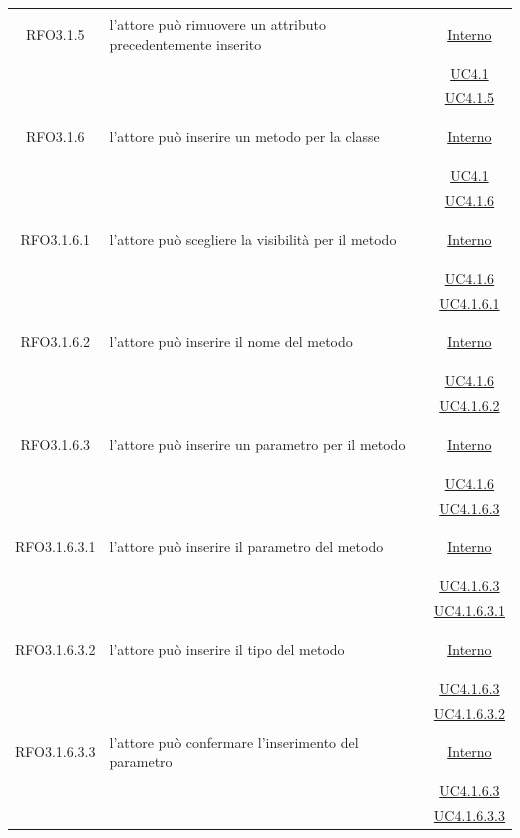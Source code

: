 \begin{itemize}
\begin{itemize}
\begin{itemize}
\begin{itemize}
\begin{longtable}{|c|>{\centering}m{7cm}|c|}
\hypertarget{RFO3.1.5}{RFO3.1.5} & l'attore può rimuovere un attributo precedentemente inserito & \hyperlink{Interno}{Interno}\\
& &\hyperref[UC4.1]{UC4.1}\\
& &\hyperref[UC4.1.5]{UC4.1.5}\\ \hline

\hypertarget{RFO3.1.6}{RFO3.1.6} & l'attore può inserire un metodo per la classe &\hyperlink{Interno}{Interno}\\
& &\hyperref[UC4.1]{UC4.1}\\
& &\hyperref[UC4.1.6]{UC4.1.6}\\ \hline

\hypertarget{RFO3.1.6.1}{RFO3.1.6.1} & l'attore può scegliere la visibilità per il metodo &\hyperlink{Interno}{Interno}\\
& &\hyperref[UC4.1.6]{UC4.1.6}\\
& &\hyperref[UC4.1.6.1]{UC4.1.6.1}\\ \hline

\hypertarget{RFO3.1.6.2}{RFO3.1.6.2} & l'attore può inserire il nome del metodo & \hyperlink{Interno}{Interno}\\
& &\hyperref[UC4.1.6]{UC4.1.6}\\
& &\hyperref[UC4.1.6.2]{UC4.1.6.2}\\ \hline

\hypertarget{RFO3.1.6.3}{RFO3.1.6.3} & l'attore può inserire un parametro per il metodo & \hyperlink{Interno}{Interno}\\
& &\hyperref[UC4.1.6]{UC4.1.6}\\
& &\hyperref[UC4.1.6.3]{UC4.1.6.3}\\ \hline

\hypertarget{RFO3.1.6.3.1}{RFO3.1.6.3.1} & l'attore può inserire il parametro del metodo &\hyperlink{Interno}{Interno}\\
& & \hyperref[UC4.1.6.3]{UC4.1.6.3}\\
& & \hyperref[UC4.1.6.3.1]{UC4.1.6.3.1}\\ \hline

\hypertarget{RFO3.1.6.3.2}{RFO3.1.6.3.2} & l'attore può inserire il tipo del metodo &\hyperlink{Interno}{Interno}\\
& &\hyperref[UC4.1.6.3]{UC4.1.6.3}\\
& &\hyperref[UC4.1.6.3.2]{UC4.1.6.3.2}\\ \hline

\hypertarget{RFO3.1.6.3.3}{RFO3.1.6.3.3} & l'attore può confermare l'inserimento del parametro & \hyperlink{Interno}{Interno}\\
& &\hyperref[UC4.1.6.3]{UC4.1.6.3}\\
& &\hyperref[UC4.1.6.3.3]{UC4.1.6.3.3}\\ \hline


\end{longtable}
\end{itemize}
\end{itemize}
\end{itemize}
\end{itemize}
